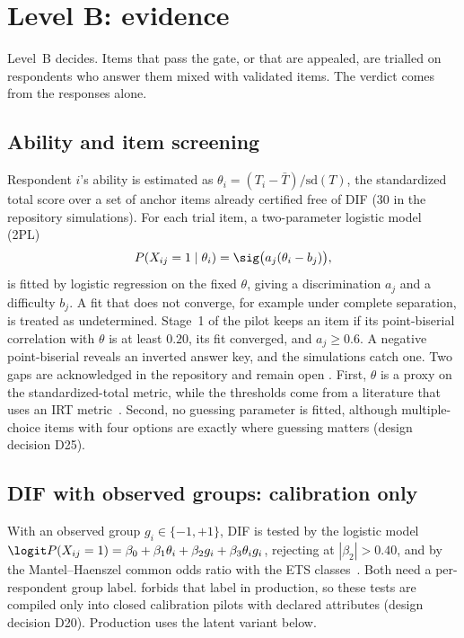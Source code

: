 \section{Level B: evidence}\label{sec:levelb}

Level~B decides. Items that pass the gate, or that are appealed, are trialled on respondents
who answer them mixed with validated items. The verdict comes from the responses alone.

\subsection{Ability and item screening}

Respondent $i$'s ability is estimated as $\theta_i=(T_i-\bar T)/\mathrm{sd}(T)$, the
standardized total score over a set of anchor items already certified free of DIF (30 in the
repository simulations). For each trial item, a two-parameter logistic model
(2PL)~\cite{birnbaum1968,lord1980}
\begin{equation}\label{eq:2pl}
  P(X_{ij}=1\mid\theta_i)=\sig\bigl(a_j(\theta_i-b_j)\bigr),
\end{equation}
is fitted by logistic regression on the fixed $\theta$, giving a discrimination $a_j$ and a
difficulty $b_j$. A fit that does not converge, for example under complete separation, is
treated as undetermined. Stage~1 of the pilot keeps an item if its point-biserial correlation
with $\theta$ is at least $0.20$, its fit converged, and $a_j\ge0.6$. A negative point-biserial
reveals an inverted answer key, and the simulations catch one. Two gaps are acknowledged in the
repository and remain open \openq. First, $\theta$ is a proxy on the standardized-total metric,
while the thresholds come from a literature that uses an IRT metric~\cite{hambleton1991}.
Second, no guessing parameter is fitted, although multiple-choice items with four options are
exactly where guessing matters (design decision D25).

\subsection{DIF with observed groups: calibration only}

With an observed group $g_i\in\{-1,+1\}$, DIF is tested by the logistic
model~\cite{swaminathan1990}
$\logit P(X_{ij}=1)=\beta_0+\beta_1\theta_i+\beta_2g_i+\beta_3\theta_ig_i$, rejecting at
$|\beta_2|>0.40$, and by the Mantel--Haenszel common odds ratio with the ETS
classes~\cite{mantel1959,holland1988mh,zieky1993}. Both need a per-respondent group label.
 forbids that label in production, so these tests are compiled only into closed
calibration pilots with declared attributes (design decision D20). Production uses the latent
variant below.

